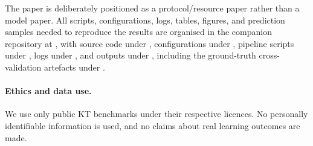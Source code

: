 The paper is deliberately positioned as a protocol/resource paper rather
than a model paper. All scripts, configurations, logs, tables, figures,
and prediction samples needed to reproduce the results are organised in
the companion repository at ,
with source code under , configurations under ,
pipeline scripts under , logs under , and
outputs under , including the ground-truth
cross-validation artefacts under .
\paragraph{Ethics and data use.}
We use only public KT benchmarks under their respective licences. No
personally identifiable information is used, and no claims about real
learning outcomes are made.


